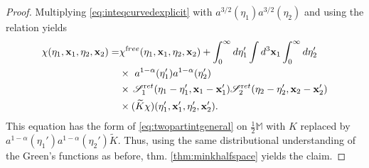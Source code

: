 \documentclass[b5paper,draft,openbib,12pt]{memoir}
\newcommand{\M}{\mathbb{M}}
\newcommand{\vx}{\mathbf{x}}
\newcommand{\ret}{{\textup ret}}
\newcommand{\free}{{\textup free}}
\begin{document}
\begin{proof}
	Multiplying \eqref{eq:inteqcurvedexplicit} with $a^{3/2}(\eta_1) a^{3/2}(\eta_2)$ and using the relation yields
	\begin{align}\nonumber
  \chi(\eta_1,\vx_1,\eta_2,\vx_2) =& \chi^\free(\eta_1,\vx_1,\eta_2,\vx_2) +\int_0^\infty d \eta_1' \int d^3 \vx_1 \int_0^\infty d \eta_2'\\
  &\times~a^{1-\alpha}(\eta_1') a^{1-\alpha}(\eta_2') \nonumber\\\nonumber
  &\times  \, \mathscr{S}_1^\ret(\eta_1-\eta_1', \vx_1-\vx_1') \mathscr{S}_2^\ret(\eta_2-\eta_2',\vx_2-\vx_2') \\
  &\times (\widetilde{K} \chi)(\eta_1',\vx_1',\eta_2',\vx_2').
\label{eq:inteqcurvedexplicit2}
\end{align}
This equation has the form of 
\eqref{eq:twopartintgeneral} on $\frac{1}{2}\M$ with $K$ 
replaced by\linebreak
 $a^{1-\alpha}(\eta_1') a^{1-\alpha}(\eta_2') 
\widetilde{K}$. Thus, using the same distributional 
understanding of the Green's functions as before, thm. 
\ref{thm:minkhalfspace} yields the claim. 
\end{proof}
\end{document}
